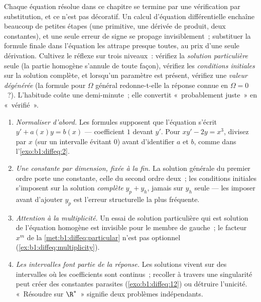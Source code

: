 \begin{remark}\label{rem:b1:diffeq:check}
Chaque équation résolue dans ce chapitre se termine par une
vérification par substitution, et ce n'est pas décoratif. Un calcul
d'équation différentielle enchaîne beaucoup de petites étapes (une
primitive, une dérivée de produit, deux constantes), et une seule
erreur de signe se propage invisiblement~; substituer la formule
finale dans l'équation les attrape presque toutes, au prix d'une seule
dérivation. Cultivez le réflexe sur trois niveaux~: vérifiez la
\emph{solution particulière} seule (la partie homogène s'annule de
toute façon), vérifiez les \emph{conditions initiales} sur la solution
complète, et lorsqu'un paramètre est présent, vérifiez une \emph{valeur
dégénérée} (la formule pour $\Omega$ général redonne-t-elle la réponse
connue en $\Omega = 0$~?). L'habitude coûte une demi-minute~; elle
convertit «~probablement juste~» en «~vérifié~».
\end{remark}

\begin{remark}\label{rem:b1:diffeq:pitfalls}
\begin{enumerate}
  \item \emph{Normaliser d'abord.} Les formules supposent que
        l'équation s'écrit $y' + a(x)y = b(x)$ --- coefficient $1$
        devant $y'$. Pour $xy' - 2y = x^3$, divisez par $x$ (sur un
        intervalle évitant $0$) avant d'identifier $a$ et $b$, comme
        dans l'\cref{exo:b1:diffeq:2}.
  \item \emph{Une constante par dimension, fixée à la fin.} La
        solution générale du premier ordre porte une constante, celle
        du second ordre deux~; les conditions initiales s'imposent sur
        la solution \emph{complète} $y_p + y_h$, jamais sur $y_h$ seule
        --- les imposer avant d'ajouter $y_p$ est l'erreur structurelle
        la plus fréquente.
  \item \emph{Attention à la multiplicité.} Un essai de solution
        particulière qui est solution de l'équation homogène est
        invisible pour le membre de gauche~; le facteur $x^m$ de
        la \cref{met:b1:diffeq:particular} n'est pas optionnel
        (\cref{ex:b1:diffeq:multiplicity}).
  \item \emph{Les intervalles font partie de la réponse.} Les
        solutions vivent sur des intervalles où les coefficients sont
        continus~; recoller à travers une singularité peut créer des
        constantes parasites (\cref{exo:b1:diffeq:12}) ou détruire
        l'unicité. «~Résoudre sur $\R^*$~» signifie deux problèmes
        indépendants.
\end{enumerate}
\end{remark}

